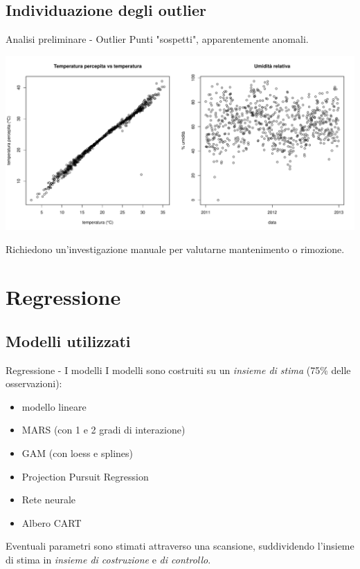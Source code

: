 \documentclass{beamer}
\begin{document}
\subsection{Individuazione degli outlier}
\begin{frame}{Analisi preliminare - Outlier}
Punti "sospetti", apparentemente anomali.
\begin{center}
  \includegraphics[height=0.5\textheight]{images/temperature-humidity.pdf}
\end{center}
Richiedono un'investigazione manuale per valutarne mantenimento o rimozione.
\end{frame}



\section{Regressione}
\subsection{Modelli utilizzati}
\begin{frame}{Regressione - I modelli}
I modelli sono costruiti su un \emph{insieme di stima} (75\% delle osservazioni):
\begin{itemize}
  \item modello lineare
  \item MARS (con 1 e 2 gradi di interazione)
  \item GAM (con loess e splines)
  \item Projection Pursuit Regression
  \item Rete neurale
  \item Albero CART
\end{itemize}
Eventuali parametri sono stimati attraverso una scansione, suddividendo
l'insieme di stima in \emph{insieme di costruzione} e \emph{di controllo}.
\end{frame}
\end{document}
